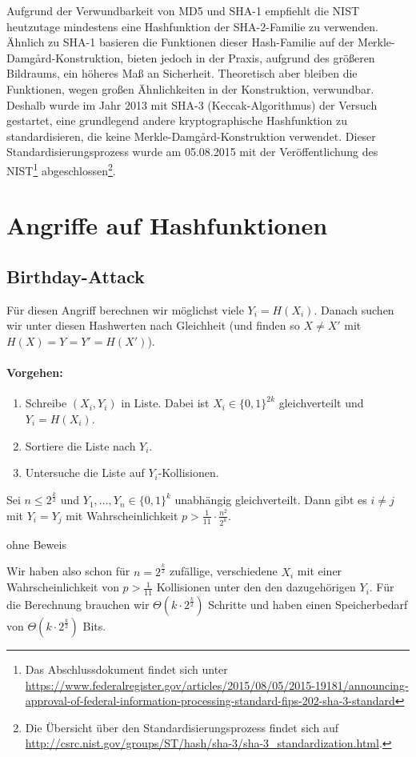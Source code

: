 Aufgrund der Verwundbarkeit von MD5 und SHA-1 empfiehlt die NIST
heutzutage mindestens eine Hashfunktion der SHA-2-Familie \indexSHATwo
zu verwenden. Ähnlich zu SHA-1 basieren die Funktionen dieser
Hash-Familie auf der Merkle-Damgård-Konstruktion, bieten jedoch in der
Praxis, aufgrund des größeren Bildraums, ein höheres Maß an
Sicherheit. Theoretisch aber bleiben die Funktionen, wegen großen
Ähnlichkeiten in der Konstruktion, verwundbar. Deshalb wurde im Jahr
2013 mit SHA-3 \indexSHAThree (\glqq Keccak\grqq{}-Algorithmus) der
Versuch gestartet, eine grundlegend andere kryptographische Hashfunktion
zu standardisieren, die keine Merkle-Damgård-Konstruktion
verwendet. Dieser Standardisierungsprozess wurde am 05.08.2015 mit der
Veröffentlichung des NIST\footnote{Das Abschlussdokument findet sich
unter
\url{https://www.federalregister.gov/articles/2015/08/05/2015-19181/announcing-approval-of-federal-information-processing-standard-fips-202-sha-3-standard}}
abgeschlossen\footnote{Die Übersicht über den Standardisierungsprozess
findet sich auf
\url{http://csrc.nist.gov/groups/ST/hash/sha-3/sha-3_standardization.html}.}.


\section{Angriffe auf Hashfunktionen}
\subsection{Birthday-Attack}\indexBirthDayAttack
Für diesen Angriff berechnen wir möglichst viele $Y_i = H(X_i)$.
Danach suchen wir unter diesen Hashwerten nach Gleichheit (und finden so
$X \not = X'$ mit $H(X) = Y = Y' = H(X')$). 
\paragraph*{Vorgehen:}
\begin{enumerate}
  \item Schreibe $(X_i, Y_i)$ in Liste. Dabei ist $X_i \in \{0,1\}^{2k}$
    gleichverteilt und $Y_i = H(X_i)$.  
  \item Sortiere die Liste nach $Y_i$.
  \item Untersuche die Liste auf $Y_i$-Kollisionen.
\end{enumerate}

\begin{theorem}
Sei $n \leq 2^{\frac{k}{2}}$ und $Y_1, \ldots , Y_n \in \{0,1\}^k$
unabhängig gleichverteilt. Dann gibt es $i \not = j$ mit $Y_i = Y_j$ mit
Wahrscheinlichkeit $p > \frac{1}{11} \cdot \frac{n^2}{2^k}$.
\end{theorem}
\begin{beweis}
  ohne Beweis
\end{beweis}
Wir haben also schon für $n = 2^{\frac{k}{2}}$ zufällige, verschiedene
$X_i$ mit einer Wahrscheinlichkeit von $p > \frac{1}{11}$ Kollisionen
unter den den dazugehörigen $Y_i$. Für die Berechnung brauchen wir
$\Theta(k \cdot 2^{\frac{k}{2}})$ Schritte und haben einen
Speicherbedarf von $\Theta(k \cdot 2^{\frac{k}{2}})$ Bits.

